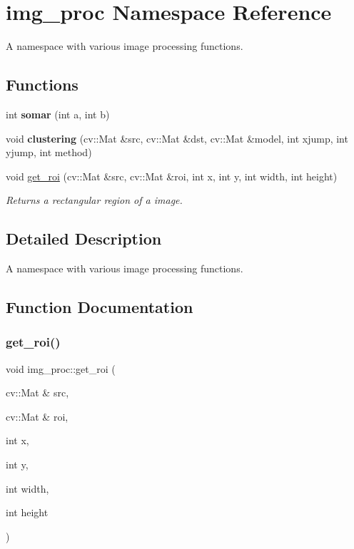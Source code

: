 \hypertarget{namespaceimg__proc}{}\section{img\+\_\+proc Namespace Reference}
\label{namespaceimg__proc}


A namespace with various image processing functions.  


\subsection*{Functions}
\begin{DoxyCompactItemize}
\item 
\mbox{\label{namespaceimg__proc_ade055a73f7f4952c3066968b515b27c6}} 
int {\bfseries somar} (int a, int b)
\item 
\mbox{\label{namespaceimg__proc_ad757b946454a5f983296e156ce13a33f}} 
void {\bfseries clustering} (cv\+::\+Mat \&src, cv\+::\+Mat \&dst, cv\+::\+Mat \&model, int xjump, int yjump, int method)
\item 
void \hyperlink{namespaceimg__proc_acfa08d173c5f86a504cb5933a3fe74d0}{get\+\_\+roi} (cv\+::\+Mat \&src, cv\+::\+Mat \&roi, int x, int y, int width, int height)
\begin{DoxyCompactList}\small\item\em Returns a rectangular region of a image. \end{DoxyCompactList}\end{DoxyCompactItemize}


\subsection{Detailed Description}
A namespace with various image processing functions. 

\subsection{Function Documentation}
\mbox{\label{namespaceimg__proc_acfa08d173c5f86a504cb5933a3fe74d0}} 
\subsubsection{\texorpdfstring{get\+\_\+roi()}{get\_roi()}}
{\footnotesize\ttfamily void img\+\_\+proc\+::get\+\_\+roi (\begin{DoxyParamCaption}\item[{cv\+::\+Mat \&}]{src,  }\item[{cv\+::\+Mat \&}]{roi,  }\item[{int}]{x,  }\item[{int}]{y,  }\item[{int}]{width,  }\item[{int}]{height }\end{DoxyParamCaption})}



